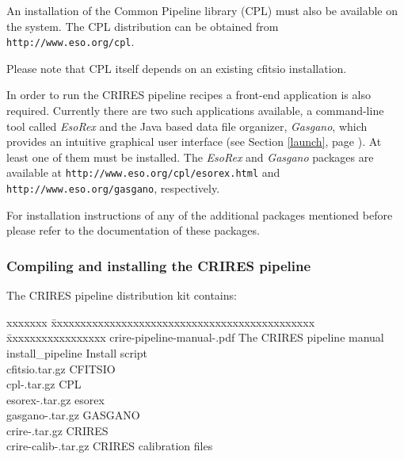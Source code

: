 An installation of the Common Pipeline library (CPL) must also be
available on the system. 
The CPL distribution can be obtained from  \texttt{http://www.eso.org/cpl}.

Please note that CPL itself depends on an existing cfitsio installation.

In order to run the CRIRES pipeline recipes a front-end application is also
required. Currently there are two such applications available, a
command-line tool called  \textit{EsoRex}  and the Java based data file
organizer,  \textit{Gasgano},  which provides an intuitive graphical user
interface (see Section \ref{launch}, page \pageref{launch}). At least one 
of them must be installed. The  \textit{EsoRex}  and
 \textit{Gasgano}  packages are available at
 \texttt{http://www.eso.org/cpl/esorex.html}  and
 \texttt{http://www.eso.org/gasgano}, respectively.

For installation instructions of any of the additional packages mentioned
before please refer to the documentation of these packages.


\subsubsection{Compiling and installing the CRIRES pipeline}
\label{PIP:compile-howto}

The CRIRES pipeline distribution kit \pipelinevers contains:

\begin{tabbing}
xxxxxxx \=  xxxxxxxxxxxxxxxxxxxxxxxxxxxxxxxxxxxxxxxxxxxxx \= xxxxxxxxxxxxxxxxx \kill
\> crire-pipeline-manual-\pipelinemanualvers.pdf    \> The CRIRES pipeline manual     \\
\> install\_pipeline                \> Install script                 \\
\> cfitsio\cfitsiovers.tar.gz               \> CFITSIO \cfitsiovers                  \\
\> cpl-\cplvers.tar.gz                   \> CPL \cplvers                        \\
\> esorex-\esorexvers.tar.gz              \> esorex \esorexvers                   \\
\> gasgano-\gasganovers.tar.gz             \> GASGANO \gasganovers                  \\
\> crire-\pipelinevers.tar.gz               \> CRIRES \pipelinevers                   \\
\> crire-calib-\pipelinevers.tar.gz         \> CRIRES calibration files \pipelinevers\\
\end{tabbing}

